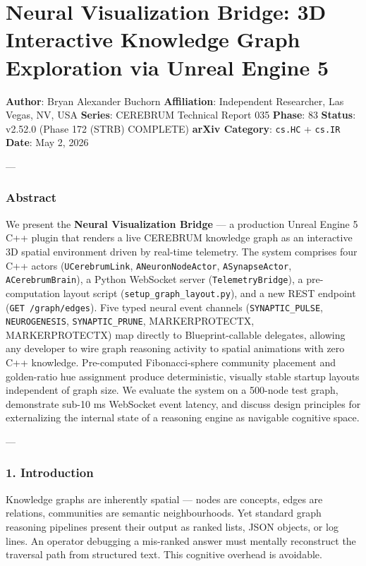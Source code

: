 \section{Neural Visual\-ization Bridge: 3D Interactive Knowledge Graph Exploration via Unreal Engine 5}

\textbf{Author}: Bryan Alexander Buchorn  
\textbf{Affiliation}: Independent Researcher, Las Vegas, NV, USA  
\textbf{Series}: CEREBRUM Technical Report 035  
\textbf{Phase}: 83  
\textbf{Status}: v2.52.0 (Phase 172 (STRB) COMPLETE)
\textbf{arXiv Category}: \texttt{cs.HC} + \texttt{cs.IR}  
\textbf{Date}: May 2, 2026

---

\subsubsection{Abstract}

We present the \textbf{Neural Visual\-ization Bridge} — a production Unreal Engine 5 C++ plugin that renders a live CEREBRUM knowledge graph as an interactive 3D spatial environment driven by real-time telemetry. The system comprises four C++ actors (\texttt{UCerebrumLink}, \texttt{ANeuronNodeActor}, \texttt{ASynapseActor}, \texttt{ACerebrumBrain}), a Python WebSocket server (\texttt{TelemetryBridge}), a pre-computation layout script (\texttt{setup\_graph\_layout.py}), and a new REST endpoint (\texttt{GET /graph/edges}). Five typed neural event channels (\texttt{SYNAPTIC\_PULSE}, \texttt{NEUROGENESIS}, \texttt{SYNAPTIC\_PRUNE}, MARKERPROTECT\-X, MARKERPROTECT\-X) map directly to Blueprint-callable delegates, allowing any developer to wire graph reasoning activity to spatial animations with zero C++ knowledge. Pre-computed Fibonacci-sphere community placement and golden-ratio hue assignment produce deter\-ministic, visually stable startup layouts independent of graph size. We evaluate the system on a 500-node test graph, demonstrate sub-10 ms WebSocket event latency, and discuss design principles for exter\-nalizing the internal state of a reasoning engine as navigable cognitive space.

---

\subsubsection{1. Introd\-uction}

Knowledge graphs are inherently spatial — nodes are concepts, edges are relations, communities are semantic neigh\-bourhoods. Yet standard graph reasoning pipelines present their output as ranked lists, JSON objects, or log lines. An operator debugging a mis-ranked answer must mentally reconstruct the traversal path from structured text. This cognitive overhead is avoidable.

